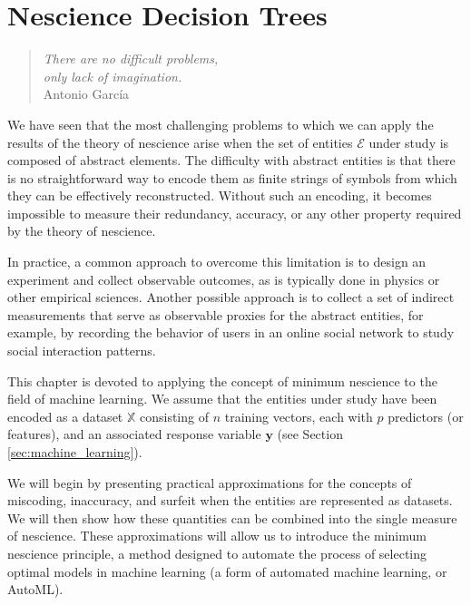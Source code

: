 %
%


\chapter{Nescience Decision Trees}
\label{chap:Nescience-Decision-Trees}

\begin{quote}
\begin{flushright}
\emph{There are no difficult problems,\\
only lack of imagination.}\\
Antonio García \\
\end{flushright}
\end{quote}
\bigskip

We have seen that the most challenging problems to which we can apply the results of the theory of nescience arise when the set of entities $\mathcal{E}$ under study is composed of abstract elements. The difficulty with abstract entities is that there is no straightforward way to encode them as finite strings of symbols from which they can be effectively reconstructed. Without such an encoding, it becomes impossible to measure their redundancy, accuracy, or any other property required by the theory of nescience.

In practice, a common approach to overcome this limitation is to design an experiment and collect observable outcomes, as is typically done in physics or other empirical sciences. Another possible approach is to collect a set of indirect measurements that serve as observable proxies for the abstract entities, for example, by recording the behavior of users in an online social network to study social interaction patterns.

This chapter is devoted to applying the concept of minimum nescience to the field of machine learning. We assume that the entities under study have been encoded as a dataset $\mathbb{X}$ consisting of $n$ training vectors, each with $p$ predictors (or features), and an associated response variable $\mathbf{y}$ (see Section \ref{sec:machine_learning}).

We will begin by presenting practical approximations for the concepts of miscoding, inaccuracy, and surfeit when the entities are represented as datasets. We will then show how these quantities can be combined into the single measure of nescience. These approximations will allow us to introduce the minimum nescience principle, a method designed to automate the process of selecting optimal models in machine learning (a form of automated machine learning, or AutoML).

